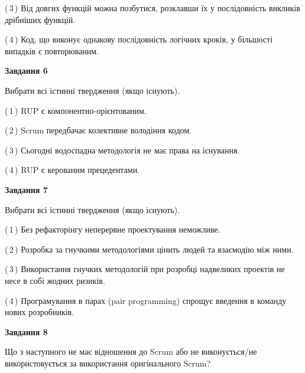 \documentclass[10pt, ukrainian]{article}
\begin{document}
{\begin {large}
(\,3\,) Від довгих функцій можна позбутися, розклавши їх у послідовність викликів дрібніших функцій. %



(\,4\,) Код, що виконує однакову послідовність логічних кроків, у більшості випадків є повторюваним.%

\newpage

{\begin {center}\textbf{Завдання 6}\end {center}}\par
Вибрати всі істинні твердження (якщо існують).\par
\vspace{2mm}



(\,1\,) RUP є компонентно-орієнтованим. %



(\,2\,) Scrum передбачає колективне володіння кодом. %



(\,3\,) Сьогодні водоспадна методологія не має права на існування. %



(\,4\,) RUP є керованим прецедентами. %


{\begin {center}\textbf{Завдання 7}\end {center}}\par
Вибрати всі істинні твердження (якщо існують).\par
\vspace{2mm}



(\,1\,) Без рефакторінгу неперервне проектування неможливе. %



(\,2\,) Розробка за гнучкими методологіями цінить людей та взаємодію між ними. %



(\,3\,) Використання гнучких методологій при розробці надвеликих проектів не несе в собі жодних ризиків. %



(\,4\,) Програмування в парах (pair programming) спрощує введення в команду нових розробників. %


{\begin {center}\textbf{Завдання 8}\end {center}}\par
Що з наступного не має відношення до Scrum або не виконується/не використовується за використання оригінального Scrum?\par
\vspace{2mm}




\end{large}}
\end{document}
